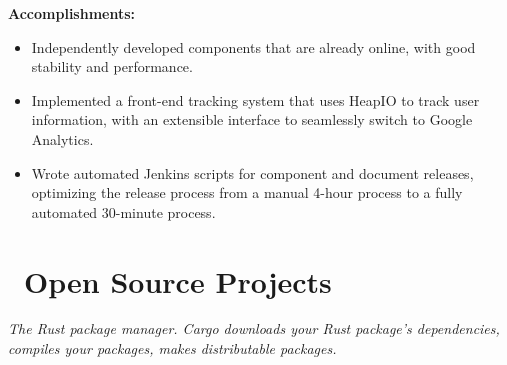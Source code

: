 \documentclass{software_engineer_rustin_liu}
\newcommand{\en}[1]{#1}
\newcommand{\zh}[1]{}
\begin{document}
\en{\textbf{Accomplishments:}}
\zh{\textbf{产出：}}
\begin{itemize}
      \item \en{Independently developed components that are already online, with good stability and performance.}
            \zh{多个独立开发的组件已经上线使用，有较好的稳定性和性能。}
      \item \en{Implemented a front-end tracking system that uses HeapIO to track user information, with an extensible interface to seamlessly switch to Google Analytics.}
            \zh{实现了前端的 tracking 系统，使用 HeapIO 追踪用户信息，并预留可扩展接口，可无缝切换至 Google Analytics。}
      \item \en{Wrote automated Jenkins scripts for component and document releases, optimizing the release process from a manual 4-hour process to a fully automated 30-minute process.}
            \zh{为组件和文档发布编写了自动化 Jenkins 脚本，将发布流程从手动 4 小时优化到全自动 30 分钟。}
\end{itemize}

\section{\faGithubAlt\ \en{Open Source Projects}\zh{开源项目}}
\en{}
\zh{\datedsubsection{\textbf{Cargo(Rust) - 维护者}}{{\href{https://github.com/search?q=repo:rust-lang/cargo+repo:rust-lang/rust+author:Rustin170506&type=commits}{260+ commits}}}}
\en{\textsl{The Rust package manager. Cargo downloads your Rust package's dependencies, compiles your packages, makes distributable packages.}}
\zh{\textsl{Rust 包管理器，Cargo 下载 Rust 包的依赖，编译包，制作可分发的包。}}
\end{document}
